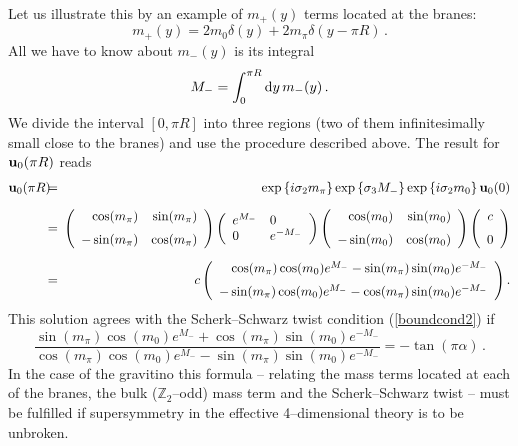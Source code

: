 \documentclass[a4paper,12pt]{article}
\def\nn{\nonumber}
\def\si{\sigma}
\def\de{\delta}
\def\al{\alpha}
\def\d{{\rm d}}
\def\bu{{\bf u}}
\def\ZZ{\mathbb Z}
\begin{document}
Let us illustrate this by an example of $m_+(y)$ terms located at the
branes: 
\begin{equation}
m_+(y)
=
2m_0\de(y)+2m_\pi\de(y-\pi R)
\,.
\end{equation}
All we have to know about $m_-(y)$ is its integral
\begin{equation}
M_-=\int_0^{\pi R}\d y\,m_-(y)
\,.
\end{equation}
We divide the interval $[0,\pi R]$ into three regions (two of them
infinitesimally small close to the branes) and use the procedure
described above. The result for $\bu_0(\pi R)$ reads
\begin{eqnarray}
\bu_0(\pi R)
\!\!\!&=&\!\!\!
\exp\left\{i\si_2m_\pi\right\}
\exp\left\{\si_3M_-\right\}
\exp\left\{i\si_2m_0\right\}\bu_0(0)
\nn\\[6pt]
\!\!\!&=&\!\!\!
\left(\begin{array}{rr}
\cos(m_\pi)&\sin(m_\pi)\\[6pt]
-\sin(m_\pi)&\cos(m_\pi)
\end{array}\right)
\left(\begin{array}{ll}
e^{M_-}&0\\
0&e^{-M_-}
\end{array}\right)
\left(\begin{array}{rr}
\cos(m_0)&\sin(m_0)\\[6pt]
-\sin(m_0)&\cos(m_0)
\end{array}\right)
\left(\begin{array}{c}
c\\[6pt]0
\end{array}\right)
\nn\\[6pt]
\!\!\!&=&\!\!\!
c\left(\begin{array}{r}
\cos(m_\pi)\cos(m_0)e^{M_-}-\sin(m_\pi)\sin(m_0)e^{-M_-}
\\[6pt]
-\sin(m_\pi)\cos(m_0)e^{M_-}-\cos(m_\pi)\sin(m_0)e^{-M_-}
\end{array}\right)
.
\end{eqnarray}
This solution agrees with the Scherk--Schwarz twist condition
(\ref{boundcond2}) if
\begin{equation}
\frac{
\sin(m_\pi)\cos(m_0)e^{M_-}+\cos(m_\pi)\sin(m_0)e^{-M_-}
}{
\cos(m_\pi)\cos(m_0)e^{M_-}-\sin(m_\pi)\sin(m_0)e^{-M_-}
}
=
-\tan(\pi\al)
\,.
\label{mass0}
\end{equation}
In the case of the gravitino this formula -- relating the mass terms
located at each of the branes, the bulk ($\ZZ_2$--odd) mass term and
the Scherk--Schwarz twist -- must be fulfilled if supersymmetry in the
effective 4--dimensional theory is to be unbroken. 
\end{document}
